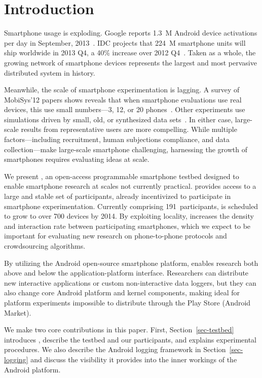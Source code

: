 \section{Introduction}
\label{sec-introduction}

Smartphone usage is exploding. Google reports 1.3~M Android device activations
per day in September, 2013~\cite{google-Sep2012-activations}. IDC projects that
224~M smartphone units will ship worldwide in 2013 Q4, a 40\% increase over
2012 Q4~\cite{idc-smartphone-growth}. Taken as a whole, the growing network of
smartphone devices represents the largest and most pervasive distributed system
in history.

Meanwhile, the scale of smartphone experimentation is lagging. A survey of
MobiSys'12 papers shows reveals that when smartphone evaluations use real
devices, this use small numbers---3, 12, or 20
phones~\cite{nowar-mobisys12,comon-mobisys12,caching-mobisys12}. Other
experiments use simulations driven by small, old, or synthesized data
sets~\cite{falcon-mobisys12,ace-mobisys12,humanmobility-mobisys12}. In either
case, large-scale results from representative users are more compelling.
While multiple factors---including recruitment, human subjections compliance,
and data collection---make large-scale smartphone challenging, harnessing the
growth of smartphones requires evaluating ideas at scale.

We present \PhoneLab{}, an open-access programmable smartphone testbed
designed to enable smartphone research at scales not currently practical.
\PhoneLab{} provides access to a large and stable set of participants,
already incentivized to participate in smartphone experimentation. Currently
comprising 191~participants, \PhoneLab{} is scheduled to grow to over 700
devices by 2014. By exploiting locality, \PhoneLab{} increases the density
and interaction rate between participating smartphones, which we expect to be
important for evaluating new research on phone-to-phone protocols and
crowdsourcing algorithms.

By utilizing the Android open-source smartphone platform, \PhoneLab{} enables
research both above and below the application-platform interface. Researchers
can distribute new interactive applications or custom non-interactive data
loggers, but they can also change core Android platform and kernel
components, making \PhoneLab{} ideal for platform experiments impossible to
distribute through the Play Store (Android Market).

We make two core contributions in this paper. First,
Section~\ref{sec-testbed} introduces \PhoneLab{}, describe the testbed and
our participants, and explains experimental procedures. We also describe the
Android logging framework in Section~\ref{sec-logging} and discuss the
visibility it provides into the inner workings of the Android platform.

